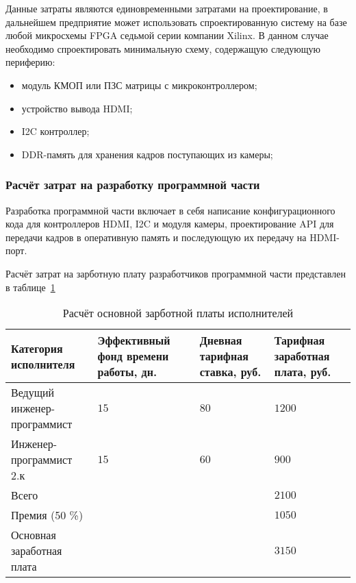 Данные затраты являются единовременными затратами на проектирование, в дальнейшем предприятие может использовать
спроектированную систему на базе любой микросхемы FPGA седьмой серии компании Xilinx. В данном случае
необходимо спроектировать минимальную схему, содержащую следующую периферию:

\begin{itemize}
  \item модуль КМОП или ПЗС матрицы с микроконтроллером;
  \item устройство вывода HDMI;
  \item I2C контроллер;
  \item DDR-память для хранения кадров поступающих из камеры;
\end{itemize}

\subsubsection{Расчёт затрат на разработку программной части}
\label{sec:economics:cost_estimation:software}

Разработка программной части включает в себя написание конфигурационного кода
для контроллеров HDMI, I2C и модуля камеры, проектирование API для
передачи кадров в оперативную память и последующую их передачу на HDMI-порт.

Расчёт затрат на зарботную плату разработчиков программной части представлен в таблице~\ref{table:economics:cost_estimation:software:employee}

\begin{table}[ht]
  \caption{Расчёт основной зарботной платы исполнителей}
  \label{table:economics:cost_estimation:software:employee}
  \begin{tabular}{| >{\centering}m{}
                  | >{\centering}m{}
                  | >{\centering}m{}
                  | >{\centering\arraybackslash}m{}|}
   \hline
    Категория исполнителя & Эффективный фонд времени работы, дн. & Дневная тарифная ставка, руб. & Тарифная заработная плата, руб. \\
   \hline
    Ведущий инженер-программист & $ 15 $ & $ 80 $ & $ 1200 $ \\
   \hline
    Инженер-программист 2.к & $ 15 $ & $ 60 $ & $ 900 $ \\
   \hline
    Всего & & & $ 2100 $ \\
   \hline
    Премия (50 \%) & & & $ 1050 $ \\
   \hline
    Основная заработная плата & & & $ 3150 $  \\
   \hline
  \end{tabular}
\end{table}

